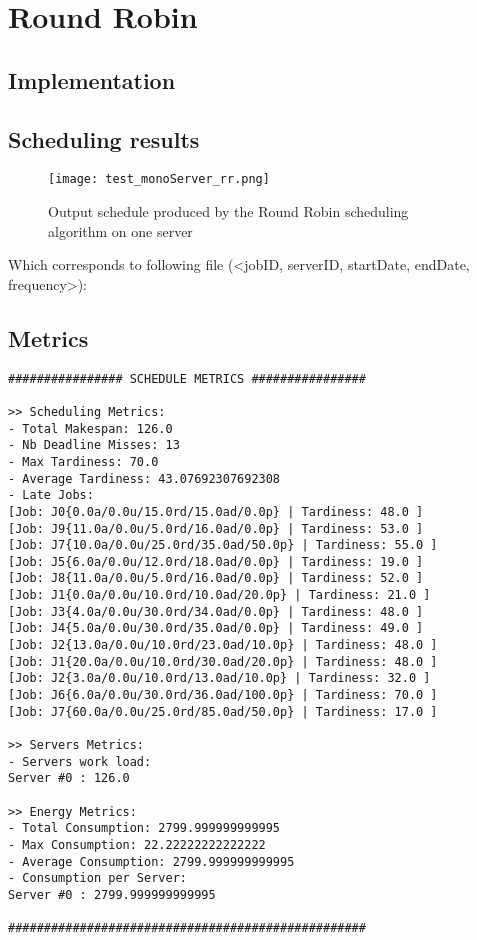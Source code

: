 \documentclass[./report.tex]{subfiles}
\begin{document}
\newpage
\section{Round Robin}
\subsection{Implementation}

\subsection{Scheduling results}
\begin{figure}[!h]
	\center
	\texttt{[image: test\_monoServer\_rr.png]}
	\caption{Output schedule produced by the Round Robin scheduling algorithm on one server}
	\label{fig:monoServer_rr} 
\end{figure}

Which corresponds to following file (<jobID, serverID, startDate, endDate, frequency>):



\newpage
\subsection{Metrics}
\begin{lstlisting}[style=txt, caption={Metrics for Round Robin on a single server}]
################ SCHEDULE METRICS ################

>> Scheduling Metrics: 
- Total Makespan: 126.0
- Nb Deadline Misses: 13
- Max Tardiness: 70.0
- Average Tardiness: 43.07692307692308
- Late Jobs: 
[Job: J0{0.0a/0.0u/15.0rd/15.0ad/0.0p} | Tardiness: 48.0 ]
[Job: J9{11.0a/0.0u/5.0rd/16.0ad/0.0p} | Tardiness: 53.0 ]
[Job: J7{10.0a/0.0u/25.0rd/35.0ad/50.0p} | Tardiness: 55.0 ]
[Job: J5{6.0a/0.0u/12.0rd/18.0ad/0.0p} | Tardiness: 19.0 ]
[Job: J8{11.0a/0.0u/5.0rd/16.0ad/0.0p} | Tardiness: 52.0 ]
[Job: J1{0.0a/0.0u/10.0rd/10.0ad/20.0p} | Tardiness: 21.0 ]
[Job: J3{4.0a/0.0u/30.0rd/34.0ad/0.0p} | Tardiness: 48.0 ]
[Job: J4{5.0a/0.0u/30.0rd/35.0ad/0.0p} | Tardiness: 49.0 ]
[Job: J2{13.0a/0.0u/10.0rd/23.0ad/10.0p} | Tardiness: 48.0 ]
[Job: J1{20.0a/0.0u/10.0rd/30.0ad/20.0p} | Tardiness: 48.0 ]
[Job: J2{3.0a/0.0u/10.0rd/13.0ad/10.0p} | Tardiness: 32.0 ]
[Job: J6{6.0a/0.0u/30.0rd/36.0ad/100.0p} | Tardiness: 70.0 ]
[Job: J7{60.0a/0.0u/25.0rd/85.0ad/50.0p} | Tardiness: 17.0 ]

>> Servers Metrics: 
- Servers work load:
Server #0 : 126.0

>> Energy Metrics: 
- Total Consumption: 2799.999999999995
- Max Consumption: 22.22222222222222
- Average Consumption: 2799.999999999995
- Consumption per Server: 
Server #0 : 2799.999999999995

##################################################
\end{lstlisting}
\end{document}
